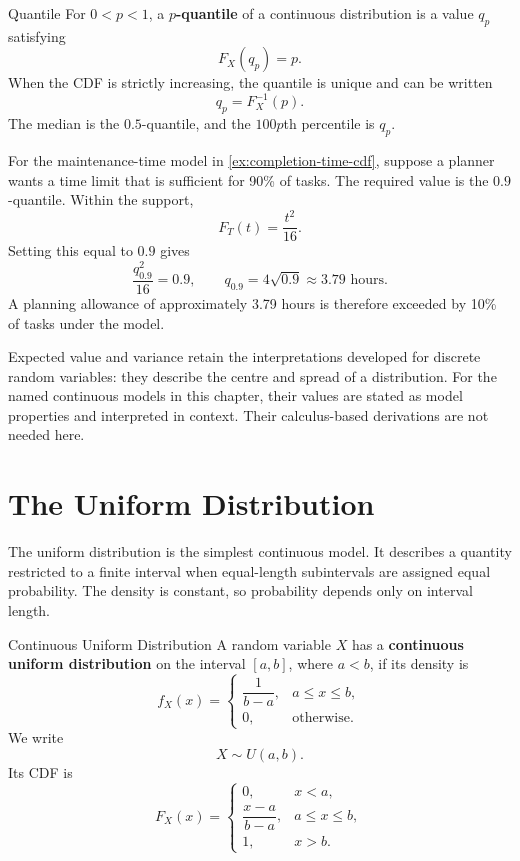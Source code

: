 \begin{definition}{Quantile}
For $0<p<1$, a \textbf{$p$-quantile} of a continuous distribution is a value $q_p$ satisfying
\[
    F_X(q_p)=p.
\]
When the CDF is strictly increasing, the quantile is unique and can be written
\[
    q_p=F_X^{-1}(p).
\]
The median is the $0.5$-quantile, and the $100p$th percentile is $q_p$.
\end{definition}

\begin{example}\par
For the maintenance-time model in \autoref{ex:completion-time-cdf}, suppose a planner wants a time limit that is sufficient for 90\% of tasks. The required value is the $0.9$-quantile. Within the support,
\[
    F_T(t)=\frac{t^2}{16}.
\]
Setting this equal to $0.9$ gives
\[
    \frac{q_{0.9}^2}{16}=0.9,
    \qquad
    q_{0.9}=4\sqrt{0.9}\approx3.79\text{ hours}.
\]
A planning allowance of approximately 3.79 hours is therefore exceeded by 10\% of tasks under the model.
\end{example}

Expected value and variance retain the interpretations developed for discrete random variables: they describe the centre and spread of a distribution. For the named continuous models in this chapter, their values are stated as model properties and interpreted in context. Their calculus-based derivations are not needed here.

\section{The Uniform Distribution}
\label{sec:uniform-distribution}

The uniform distribution is the simplest continuous model. It describes a quantity restricted to a finite interval when equal-length subintervals are assigned equal probability. The density is constant, so probability depends only on interval length.

\begin{definition}{Continuous Uniform Distribution}
A random variable $X$ has a \textbf{continuous uniform distribution} on the interval $[a,b]$, where $a<b$, if its density is
\[
f_X(x)=
\begin{cases}
\dfrac{1}{b-a}, & a\leq x\leq b,\\
0, & \text{otherwise}.
\end{cases}
\]
We write
\[
    X\sim U(a,b).
\]
Its CDF is
\[
F_X(x)=
\begin{cases}
0, & x<a,\\
\dfrac{x-a}{b-a}, & a\leq x\leq b,\\
1, & x>b.
\end{cases}
\]
\end{definition}

